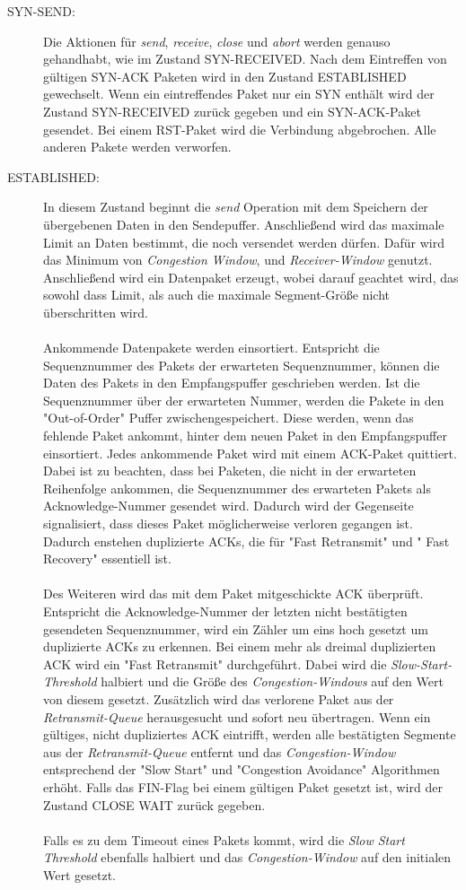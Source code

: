 \begin{description}
	
\item[SYN-SEND:]
Die Aktionen für \textit{send}, \textit{receive},\textit{ close} und \textit{abort} werden genauso gehandhabt, wie im Zustand SYN-RECEIVED.
Nach dem Eintreffen von gültigen SYN-ACK Paketen wird in den Zustand ESTABLISHED gewechselt. Wenn ein eintreffendes Paket nur ein SYN enthält wird der Zustand SYN-RECEIVED zurück gegeben und ein SYN-ACK-Paket gesendet. Bei einem RST-Paket wird die Verbindung abgebrochen. Alle anderen Pakete werden verworfen.   
	
\item[ESTABLISHED:]

In diesem Zustand beginnt die \textit{send} Operation mit dem Speichern der übergebenen Daten in den Sendepuffer. Anschließend wird das maximale Limit an Daten bestimmt, die noch versendet werden dürfen. Dafür wird das Minimum von \textit{Congestion Window}, und \textit{Receiver-Window} genutzt. Anschließend wird ein Datenpaket erzeugt, wobei darauf geachtet wird, das sowohl dass Limit, als auch die maximale Segment-Größe nicht überschritten wird. \\\\
Ankommende Datenpakete werden einsortiert. Entspricht die Sequenznummer des Pakets der erwarteten Sequenznummer, können die Daten des Pakets in den Empfangspuffer geschrieben werden. Ist die Sequenznummer über der erwarteten Nummer, werden die Pakete in den "{}Out-of-Order"{} Puffer zwischengespeichert. Diese werden, wenn das fehlende Paket ankommt, hinter dem neuen Paket in den Empfangspuffer einsortiert. Jedes ankommende Paket wird mit einem ACK-Paket quittiert. Dabei ist zu beachten, dass bei Paketen, die nicht in der erwarteten Reihenfolge ankommen, die Sequenznummer des erwarteten Pakets als Acknowledge-Nummer gesendet wird. Dadurch wird der Gegenseite signalisiert, dass dieses Paket möglicherweise verloren gegangen ist. Dadurch enstehen duplizierte ACKs,  die für  "{}Fast Retransmit"{} und "{} Fast Recovery"{} essentiell ist.\\\\
Des Weiteren wird das mit dem Paket mitgeschickte ACK überprüft. Entspricht die Acknowledge-Nummer der letzten nicht bestätigten gesendeten Sequenznummer, wird ein Zähler um eins hoch gesetzt um duplizierte ACKs zu erkennen. Bei einem mehr als dreimal duplizierten ACK wird ein {}"Fast Retransmit"{} durchgeführt. Dabei wird die \textit{Slow-Start-Threshold} halbiert und die Größe des \textit{Congestion-Windows} auf den Wert von diesem gesetzt. Zusätzlich wird das verlorene Paket aus der \textit{Retransmit-Queue} herausgesucht und sofort neu übertragen. Wenn ein gültiges, nicht dupliziertes ACK eintrifft, werden alle bestätigten Segmente aus der \textit{Retransmit-Queue} entfernt und das \textit{Congestion-Window} entsprechend der "{}Slow Start"{} und "{}Congestion Avoidance"{} Algorithmen erhöht. Falls das FIN-Flag bei einem gültigen Paket gesetzt ist, wird der Zustand CLOSE WAIT zurück gegeben.  \\\\
Falls es zu dem Timeout eines Pakets kommt, wird die \textit{Slow Start Threshold} ebenfalls halbiert und das \textit{Congestion-Window} auf den initialen Wert gesetzt. 


\end{description}
